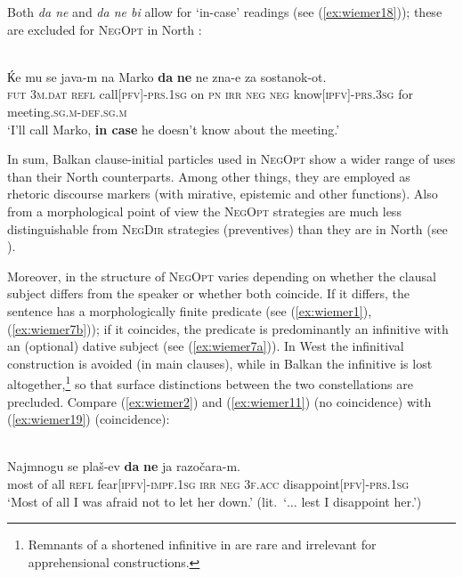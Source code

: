 \documentclass[output=paper,colorlinks,citecolor=brown]{langscibook}
\begin{document}
Both  \textit{da ne} and  \textit{da ne bi} allow for `in-case' readings (see (\ref{ex:wiemer18})); these are excluded for \textsc{NegOpt} in North :


\ea
\label{ex:wiemer18} 
 \\
\gll Ќe mu se java-m na Marko \textbf{da} \textbf{ne} ne zna-e za sostanok-ot. \\
\textsc{fut} \textsc{3m.dat} \textsc{refl} call\textsc{[pfv]-prs.1sg} on \textsc{pn} \textsc{irr} \textsc{neg} \textsc{neg} know\textsc{[ipfv]-prs.3sg} for meeting\textsc{.sg.m-def.sg.m} \\
\glt `I'll call Marko, \textbf{in case} he doesn't know about the meeting.' \\
\z


 In sum, Balkan  clause-initial particles used in \textsc{NegOpt} show a wider range of uses than their North  counterparts. Among other things, they are employed as rhetoric discourse markers (with mirative, epistemic and other functions). Also from a morphological point of view the \textsc{NegOpt} strategies are much less distinguishable from \textsc{NegDir} strategies (preventives) than they are in North  (see ).


Moreover, in  the structure of \textsc{NegOpt} varies depending on whether the clausal subject differs from the speaker or whether both coincide. If it differs, the sentence has a morphologically finite predicate (see (\ref{ex:wiemer1}), (\ref{ex:wiemer7b})); if it coincides, the predicate is predominantly an infinitive with an (optional) dative subject (see (\ref{ex:wiemer7a})). In West  the infinitival construction is avoided (in main clauses), while in Balkan  the infinitive is lost altogether,\footnote{Remnants of a shortened infinitive in  are rare and irrelevant for apprehensional constructions.} so that surface distinctions between the two constellations are precluded. Compare (\ref{ex:wiemer2}) and (\ref{ex:wiemer11}) (no coincidence) with (\ref{ex:wiemer19}) (coincidence):

\ea
\label{ex:wiemer19} 
 \\
\gll Najmnogu se plaš-ev \textbf{da} \textbf{ne} ja razočara-m. \\
{most of all} \textsc{refl} fear\textsc{[ipfv]-impf.1sg} \textsc{irr} \textsc{neg} \textsc{3f.acc} disappoint\textsc{[pfv]-prs.1sg} \\
\glt `Most of all I was afraid not to let her down.' (lit.\ `$\ldots$ lest I disappoint her.') \\
\z
\end{document}
